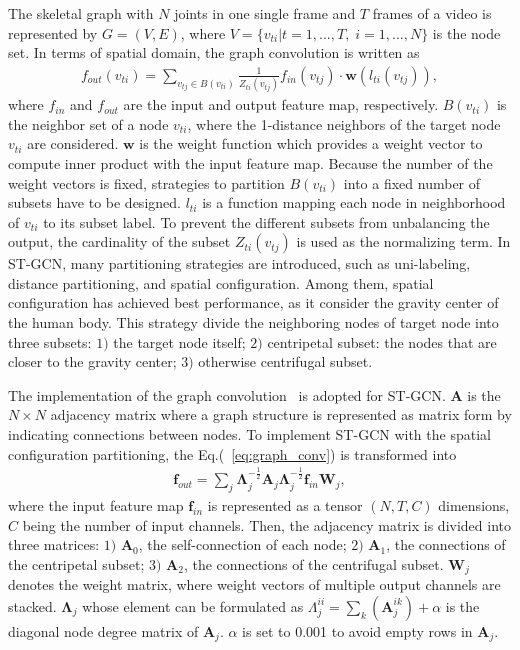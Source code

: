\documentclass[10pt,twocolumn,letterpaper]{article}
\begin{document}
The skeletal graph with $N$ joints in one single frame and $T$ frames of a video is represented by $G=(V,E)$, where $V=\{v_{ti}|t=1,...,T,\; i=1,...,N\}$ is the node set.
In terms of spatial domain, the graph convolution is written as 
\begin{equation}
\begin{aligned}
\label{eq:graph_conv}
  f_{out}(v_{ti})=\underset{v_{tj} \in B(v_{ti})}{\sum}\frac{1}{Z_{ti}(v_{tj})}f_{in}(v_{tj})\cdot \mathbf{w}(l_{ti}(v_{tj})),
\end{aligned}
\end{equation}
where $f_{in}$ and $f_{out}$ are the input and output feature map, respectively. 
$B(v_{ti})$ is the neighbor set of a node $v_{ti}$, where the 1-distance neighbors of the target node $v_{ti}$ are considered.
$\mathbf{w}$ is the weight function which provides a weight vector to compute inner product with the input feature map.
Because the number of the weight vectors is fixed, strategies to partition $B(v_{ti})$ into a fixed number of subsets have to be designed. 
$l_{ti}$ is a function mapping each node in neighborhood of $v_{ti}$ to its subset label. 
To prevent the different subsets from unbalancing the output, the cardinality of the subset $Z_{ti}(v_{tj})$ is used as the normalizing term.
In ST-GCN, many partitioning strategies are introduced, such as uni-labeling, distance partitioning, and spatial configuration.
Among them, spatial configuration has achieved best performance, as it consider the gravity center of the human body.
This strategy divide the neighboring nodes of target node into three subsets: 
$1)$ the target node itself; 
$2)$ centripetal subset: the nodes that are closer to the gravity center; 
$3)$ otherwise centrifugal subset.

The implementation of the graph convolution~\cite{kipf2016semi} is adopted for ST-GCN. 
$\mathbf{A}$ is the $N\times N$ adjacency matrix where a graph structure is represented as matrix form by indicating connections between nodes.
To implement ST-GCN with the spatial configuration partitioning, the Eq.(~\ref{eq:graph_conv}) is transformed into
\begin{equation}
\begin{aligned}
\label{eq:graph_for_spatial}
  \mathbf{f}_{out}=\overset{}{\underset{j}{\sum}}\mathbf{\Lambda}_j^{-\frac{1}{2}}\mathbf{A}_j\mathbf{\Lambda}_j^{-\frac{1}{2}}\mathbf{f}_{in} \mathbf{W}_j,
\end{aligned}
\end{equation}
where the input feature map $\mathbf{f}_{in}$ is represented as a tensor $(N, T, C)$ dimensions, $C$ being the number of input channels.
Then, the adjacency matrix is divided into three matrices: 
$1)$ $\mathbf{A}_0$, the self-connection of each node; 
$2)$ $\mathbf{A}_1$, the connections of the centripetal subset; 
$3)$ $\mathbf{A}_2$, the connections of the centrifugal subset.
$\mathbf{W}_j$ denotes the weight matrix, where weight vectors of multiple output channels are stacked.
$\mathbf{\Lambda}_j$ whose element can be formulated as $\Lambda^{ii}_j=\sum_k(\mathbf{A}_j^{ik})+\alpha$ is the diagonal node degree matrix of $\mathbf{A}_j$. 
$\alpha$ is set to 0.001 to avoid empty rows in $\mathbf{A}_j$.
\end{document}
